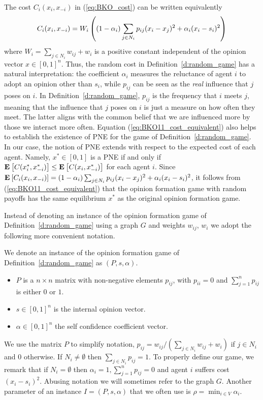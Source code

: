The cost $C_i(x_i,x_{-i})$ in (\ref{eq:BKO_cost}) can be written equivalently
\begin{equation}\label{eq:BKO11_cost_equivalent}
  C_i(x_i,x_{-i}) =
  W_i\left( (1-\alpha_i)\sum_{j \in N_i} p_{ij}(x_i-x_j)^2
  + \alpha_i(x_i-s_i)^2\right)
\end{equation}
where $W_i=\sum_{j\in N_i}w_{ij} + w_i$ is a positive constant independent
of the opinion vector $x\in [0,1]^n$.
Thus, the random cost in Definition~\ref{d:random_game} has a natural
interpretation: the coefficient $\alpha_i$ measures the reluctance of agent
$i$ to adopt an opinion other than $s_i$, while $p_{ij}$ can be seen as the
\emph{real} influence that $j$ poses on $i$.
In Definition~\ref{d:random_game}, $p_{ij}$ is the frequency that
$i$ meets $j$, meaning that the influence that $j$ poses on $i$ is just a measure
on how often they meet. The latter aligns with the common belief
that we are influenced more by those we interact more often.
Equation (\ref{eq:BKO11_cost_equivalent}) also helps to establish the existence
of PNE for the game of Definition~\ref{d:random_game}.
In our case, the notion of PNE extends with respect to the expected cost of each
agent. Namely, $x^* \in [0,1]$ is a PNE if and only if
$\Exp{C(x_i^*, x_{-i}^*)} \leq \Exp{C(x_i, x_{-i}^*)}$
for each agent $i$.
Since
$\bm{\mathrm{E}}_{} \left[ C_i(x_i,x_{-i}) \right]=
(1-\alpha_i) \sum_{j \in N_i}p_{ij}(x_i-x_j)^2 + \alpha_i(x_i-s_i)^2 $,
it follows from (\ref{eq:BKO11_cost_equivalent}) that the
opinion formation game with random payoffs has the same equilibrium $x^*$ as
the original opinion formation game.

Instead of denoting an instance of the opinion formation game of
Definition~\ref{d:random_game} using a graph $G$ and weights $w_{ij}$, $w_i$
we adopt the following more convenient notation.
%
\begin{definition}\label{d:instance}
  We denote an instance of the opinion formation game of Definition~\ref{d:random_game}
  as $(P,s,\alpha)$.
  \begin{itemize}
    \item $P$ is a $n \times n$  matrix with non-negative elements $p_{ij}$,
      with $p_{ii}=0$ and $\sum_{j=1}^n p_{ij}$ is either $0$ or $1$.
    \item $s \in [0,1]^n$ is the internal opinion vector.
    \item $\alpha \in [0,1]^n$ the self confidence coefficient vector.
  \end{itemize}
\end{definition}
%
We use the matrix $P$ to simplify notation, $p_{ij} = w_{ij}/(\sum_{j \in N_i}w_{ij}+w_i)$
if $j \in N_i$ and $0$ otherwise. If $N_i \neq \emptyset$ then $\sum_{j \in N_i}p_{ij}=1$.
To properly define our game, we remark that if $N_i=\emptyset$ then
$\alpha_i=1,\sum_{j=1}^np_{ij}=0$ and agent $i$ suffers cost $(x_i-s_i)^2$.
Abusing notation we will sometimes refer to the graph $G$.
Another parameter of an instance $I=(P,s,\alpha)$ that we often use is
$\rho=\min_{i \in V}\alpha_i$.

